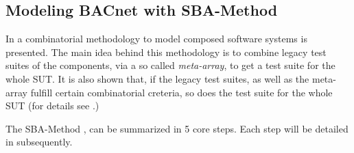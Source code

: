\documentclass[conference]{IEEEtran}
\begin{document}
	
%	
%	
	

	\subsection{Modeling BACnet with SBA-Method}
	In \cite{kampel2017combinatorial} a combinatorial methodology to model composed software systems is presented.
	The main idea behind this methodology is to combine legacy test suites of the components,
	via a so called \emph{meta-array}, to get a test suite for the whole SUT.
	It is also shown that, if the legacy test suites, as well as the meta-array fulfill certain combinatorial creteria,
	so does the test suite for the whole SUT (for details see \cite{kampel2017combinatorial}.)
	
	
	The SBA-Method \cite{kampel2017combinatorial}, can be summarized in 5 core steps. Each step will be detailed in subsequently.
	
\end{document}
